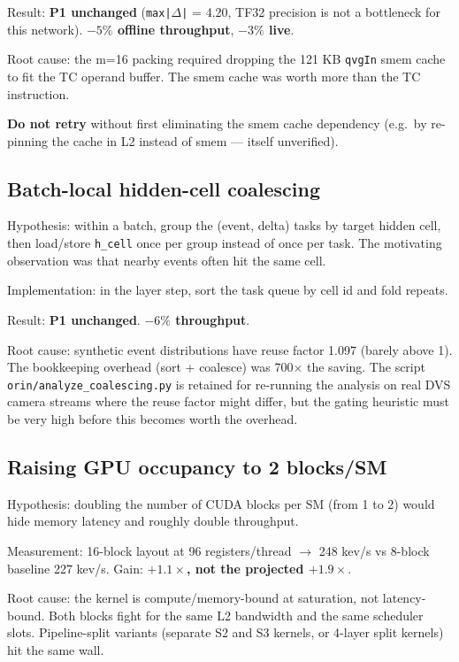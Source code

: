 \documentclass[11pt,a4paper]{article}
\begin{document}
Result: \textbf{P1 unchanged} (\texttt{max|}$\Delta$\texttt{|} = 4.20,
TF32 precision is not a bottleneck for this network). \textbf{$-5\%$
offline throughput}, \textbf{$-3\%$ live}.

Root cause: the m=16 packing required dropping the 121 KB
\texttt{qvgIn} smem cache to fit the TC operand buffer. The smem cache
was worth more than the TC instruction.

\textbf{Do not retry} without first eliminating the smem cache
dependency (e.g.\ by re-pinning the cache in L2 instead of smem ---
itself unverified).

\subsection{Batch-local hidden-cell coalescing}

Hypothesis: within a batch, group the (event, delta) tasks by target
hidden cell, then load/store \texttt{h\_cell} once per group instead of
once per task. The motivating observation was that nearby events
often hit the same cell.

Implementation: in the layer step, sort the task queue by cell id and
fold repeats.

Result: \textbf{P1 unchanged}. \textbf{$-6\%$ throughput}.

Root cause: synthetic event distributions have reuse factor 1.097
(barely above 1). The bookkeeping overhead (sort + coalesce) was
700$\times$ the saving. The script
\texttt{orin/analyze\_coalescing.py} is retained for re-running the
analysis on real DVS camera streams where the reuse factor might
differ, but the gating heuristic must be very high before this
becomes worth the overhead.

\subsection{Raising GPU occupancy to 2 blocks/SM}

Hypothesis: doubling the number of CUDA blocks per SM (from 1 to 2)
would hide memory latency and roughly double throughput.

Measurement: 16-block layout at 96 registers/thread $\to$ 248 kev/s vs
8-block baseline 227 kev/s. Gain: \textbf{$+1.1\times$, not the
projected $+1.9\times$}.

Root cause: the kernel is compute/memory-bound at saturation, not
latency-bound. Both blocks fight for the same L2 bandwidth and the
same scheduler slots. Pipeline-split variants (separate S2 and S3
kernels, or 4-layer split kernels) hit the same wall.
\end{document}

